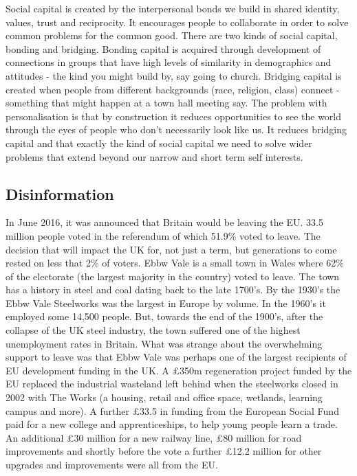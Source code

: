 Social capital is created by the interpersonal bonds we build in shared identity, values, trust and reciprocity. It encourages people to collaborate in order to solve common problems for the common good. There are two kinds of social capital, bonding and bridging. Bonding capital is acquired through development of connections in groups that have high levels of similarity in demographics and attitudes - the kind you might build by, say going to church. Bridging capital is created when people from different backgrounds (race, religion, class) connect - something that might happen at a town hall meeting say. The problem with personalisation is that by construction it reduces opportunities to see the world through the eyes of people who don't necessarily look like us. It reduces bridging capital and that exactly the kind of social capital we need to solve wider problems that extend beyond our narrow and short term self interests.

\subsection{Disinformation}

In June 2016, it was announced that Britain would be leaving the EU. 33.5 million people voted in the referendum of which 51.9\% voted to leave. The decision that will impact the UK for, not just a term, but generations to come rested on less that 2\% of voters. Ebbw Vale is a small town in Wales where 62\% of the electorate (the largest majority in the country) voted to leave. The town has a history in steel and coal dating back to the late 1700's. By the 1930's the Ebbw Vale Steelworks was the largest in Europe by volume. In the 1960's it employed some 14,500 people. But, towards the end of the 1900's, after the collapse of the UK steel industry, the town suffered one of the highest unemployment rates in Britain. What was strange about the overwhelming support to leave was that Ebbw Vale was perhaps one of the largest recipients of EU development funding in the UK. A \pounds350m regeneration project funded by the EU replaced the industrial wasteland left behind when the steelworks closed in 2002 with The Works (a housing, retail and office space, wetlands, learning campus and more). A further \pounds33.5 in funding from the European Social Fund paid for a new college and apprenticeships, to help young people learn a trade. An additional \pounds30 million for a new railway line, \pounds80 million for road improvements and shortly before the vote a further \pounds12.2 million for other upgrades and improvements were all from the EU. 

